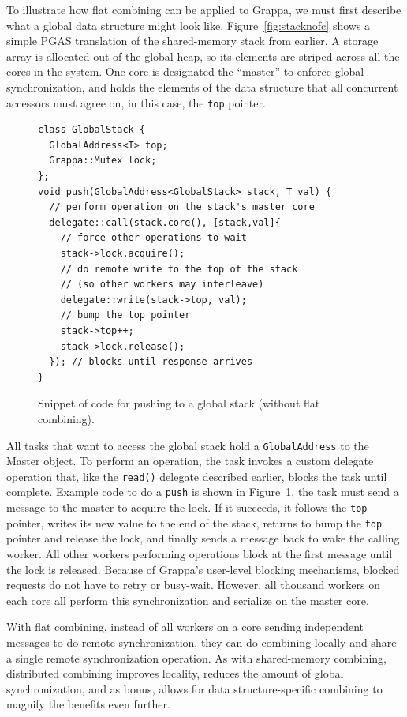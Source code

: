 To illustrate how flat combining can be applied to Grappa, we must first describe what a global data structure might look like. Figure~\ref{fig:stacknofc} shows a simple PGAS translation of the shared-memory stack from earlier. A storage array is allocated out of the global heap, so its elements are striped across all the cores in the system. One core is designated the ``master'' to enforce global synchronization, and holds the elements of the data structure that all concurrent accessors must agree on, in this case, the \texttt{top} pointer.

\begin{figure}[t]
\centering
\begin{lstlisting}[style=grappa]
class GlobalStack {
  GlobalAddress<T> top;
  Grappa::Mutex lock;
};
void push(GlobalAddress<GlobalStack> stack, T val) {
  // perform operation on the stack's master core
  delegate::call(stack.core(), [stack,val]{
    // force other operations to wait
    stack->lock.acquire();
    // do remote write to the top of the stack
    // (so other workers may interleave)
    delegate::write(stack->top, val);
    // bump the top pointer
    stack->top++;
    stack->lock.release();
  }); // blocks until response arrives
}
\end{lstlisting}

\caption{Snippet of code for pushing to a global stack (without flat combining).}
\label{fig:push}
\end{figure}


All tasks that want to access the global stack hold a \texttt{GlobalAddress} to the Master object. To perform an operation, the task invokes a custom delegate operation that, like the \texttt{read()} delegate described earlier, blocks the task until complete. Example code to do a \texttt{push} is shown in Figure~\ref{fig:push}, the task must send a message to the master to acquire the lock. If it succeeds, it follows the \texttt{top} pointer, writes its new value to the end of the stack, returns to bump the \texttt{top} pointer and release the lock, and finally sends a message back to wake the calling worker. All other workers performing operations block at the first message until the lock is released. Because of Grappa's user-level blocking mechanisms, blocked requests do not have to retry or busy-wait. However, all thousand workers on each core all perform this synchronization and serialize on the master core.

With flat combining, instead of all workers on a core sending independent messages to do remote synchronization, they can do combining locally and share a single remote synchronization operation. 
As with shared-memory combining, distributed combining improves locality, reduces the amount of global synchronization, and as bonus, allows for data structure-specific combining to magnify the benefits even further.

